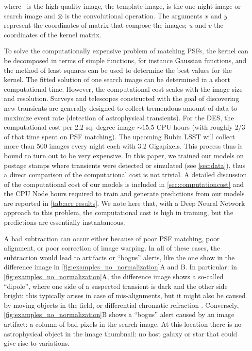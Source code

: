 \noindent 
where \temp\ is the high-quality image, the template image, \search is the one night image or search image and $\otimes$ is the convolutional operation. The arguments $x$ and $y$ represent the coordinates of matrix that compose the images; $u$ and $v$ the coordinates of the kernel matrix. 

To solve the computationally expensive problem of matching PSFs, the kernel can be decomposed in terms of simple functions, for instance Gaussian functions, and the method of least squares can be used to determine the best values for the kernel. The fitted solution of one search image can be determined in a short computational time. However, the computational cost scales with the image size and resolution. Surveys and telescopes constructed with the goal of discovering new transients are generally designed to collect tremendous amount of data to maximize event rate (detection of astrophysical transients).  For the DES, the computational cost per 2.2 sq. degree image $\sim 15.5$ CPU hours (with roughly 2/3 of that time spent on PSF matching).  The upcoming Rubin LSST will collect more than 500 images every night each with 3.2 Gigapixels. This process thus is bound to turn out to be very expensive.
In this paper, we trained our models on postage stamps where transients were detected or simulated (see \autoref{sec:data}), thus a direct comparison of the computational cost is not trivial. A detailed discussion of the computational cost of our models is included in \autoref{sec:computationcost} and the CPU Node hours required to train and generate predictions from our models are reported in \autoref{tab:acc results}. We note here that, with a Deep Neural Network approach to this problem, the computational cost is high in training, but the predictions are essentially instantaneous.

A bad subtraction can occur either because of poor PSF matching, poor alignment, or poor correction of image warping. In all of these cases, the subtraction would lead to artifacts or ``bogus'' alerts, like the one show in the difference image in  \autoref{fig:examples_no_normalization}A and B. In particular: in \autoref{fig:examples_no_normalization}A, the difference image shows a so-called ``dipole'', where one side of a suspected transient is dark and the other side bright: this typically arises in case of mis-alignments, but it might also be caused by moving objects in the field, or differential chromatic refraction \citep{carrascodavis2021alert}. Conversely, \autoref{fig:examples_no_normalization}B shows a ``bogus'' alert caused by an image artifact: a column of bad pixels in the search image. At this location there is no astrophysical object in the image thumbnail: no host galaxy or star that could give rise to variations.

